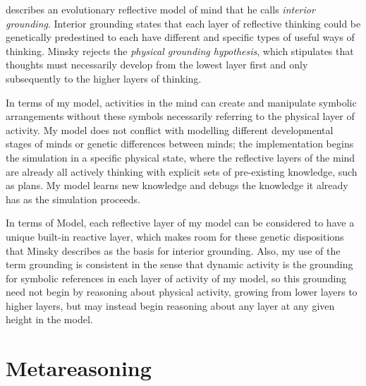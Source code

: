 \cite{minsky:2005} describes an evolutionary reflective model of mind
that he calls \emph{interior grounding}.  Interior grounding states
that each layer of reflective thinking could be genetically
predestined to each have different and specific types of useful ways
of thinking.  Minsky rejects the \emph{physical grounding hypothesis},
which stipulates that thoughts must necessarily develop from the
lowest layer first and only subsequently to the higher layers of
thinking.

In terms of my model, activities in the mind can create and manipulate
symbolic arrangements without these symbols necessarily referring to
the physical layer of activity.  My model does not conflict with
modelling different developmental stages of minds or genetic
differences between minds; the implementation begins the simulation in
a specific physical state, where the reflective layers of the mind are
already all actively thinking with explicit sets of pre-existing
knowledge, such as plans.  My model learns new knowledge and debugs
the knowledge it already has as the simulation proceeds.

In terms of Model, each reflective layer of my model can
be considered to have a unique built-in reactive layer, which makes
room for these genetic dispositions that Minsky describes as the basis
for interior grounding.  Also, my use of the term grounding is
consistent in the sense that dynamic activity is the grounding for
symbolic references in each layer of activity of my model, so this
grounding need not begin by reasoning about physical activity, growing
from lower layers to higher layers, but may instead begin reasoning
about any layer at any given height in the model.

\section{Metareasoning}

